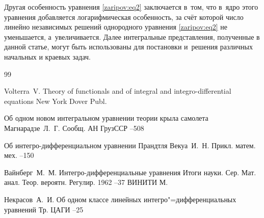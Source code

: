 {Другая особенность уравнения \eqref{zaripov:eq2} заключается в~том, что в~ядро этого уравнения добавляется логарифмическая особенность, за счёт которой число линейно независимых решений однородного уравнения \eqref{zaripov:eq2} не уменьшается, а~увеличивается.   	
Далее интегральные представления, полученные в данной статье, могут быть использованы для постановки и~решения различных начальных и краевых задач.




\begin{thebibliography}{99}

\by Volterra~V.
\book Theory of functionals and of integral and integro-differential equations
\publaddr New York
\publ Dover Publ.

\paper Об одном новом интегральном уравнении теории крыла самолета
\by Магнарадзе~Л.~Г.
\jour Сообщ. АН ГрузССР
--508

\paper Об интегро-дифференциальном уравнении Прандтля
\by Векуа~И.~Н.
\jour Прикл. матем. мех.
--150

\by Вайнберг~М.~М.
\paper Интегро-дифференциальные уравнения
\serial Итоги науки. Сер. Мат. анал. Теор. вероятн. Регулир. 1962
--37
\publ ВИНИТИ
\publaddr М.

\by Некрасов~А.~И.
\paper Об одном классе линейных интегро"=дифференциальных уравнений
\jour  Тр. ЦАГИ
–25


\end{thebibliography}}
